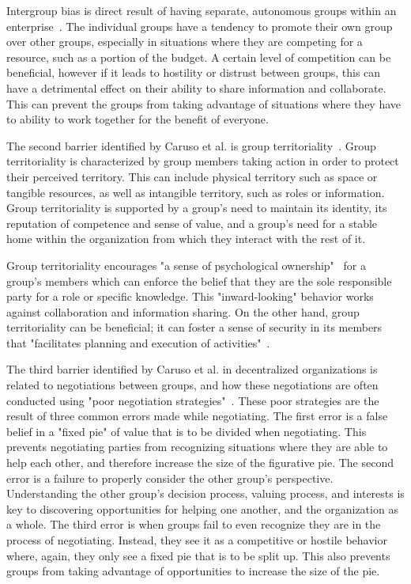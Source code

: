 Intergroup bias is direct result of having separate, autonomous groups within an enterprise~\cite{caruso2008boundaries}. The individual groups have a tendency to promote their own group over other groups, especially in situations where they are competing for a resource, such as a portion of the budget. A certain level of competition can be beneficial, however if it leads to hostility or distrust between groups, this can have a detrimental effect on their ability to share information and collaborate. This can prevent the groups from taking advantage of situations where they have to ability to work together for the benefit of everyone. 

The second barrier identified by Caruso et al. is group territoriality~\cite{caruso2008boundaries}. Group territoriality is characterized by group members taking action in order to protect their perceived territory. This can include physical territory such as space or tangible resources, as well as intangible territory, such as roles or information. Group territoriality is supported by a group's need to maintain its identity, its reputation of competence and sense of value, and a group's need for a stable home within the organization from which they interact with the rest of it.

Group territoriality encourages "a sense of psychological ownership"~\cite{caruso2008boundaries} for a group's members which can enforce the belief that they are the sole responsible party for a role or specific knowledge. This "inward-looking" behavior works against collaboration and information sharing. On the other hand, group territoriality can be beneficial; it can foster a sense of security in its members that "facilitates planning and execution of activities"~\cite{caruso2008boundaries}. 

The third barrier identified by Caruso et al. in decentralized organizations is related to negotiations between groups, and how these negotiations are often conducted using "poor negotiation  strategies"~\cite{caruso2008boundaries}. These poor strategies are the result of three common errors made while negotiating. The first error is a false belief in a "fixed pie" of value that is to be divided when negotiating. This prevents negotiating parties from recognizing situations where they are able to help each other, and therefore increase the size of the figurative pie. The second error is a failure to properly consider the other group's perspective. Understanding the other group's decision process, valuing process, and interests is key to discovering opportunities for helping one another, and the organization as a whole. The third error is when groups fail to even recognize they are in the process of negotiating. Instead, they see it as a competitive or hostile behavior where, again, they only see a fixed pie that is to be split up. This also prevents groups from taking advantage of opportunities to increase the size of the pie.    


%
%
%
